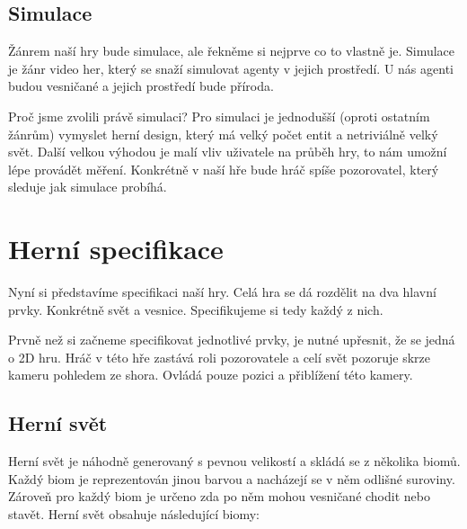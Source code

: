 
\subsection{Simulace}
Žánrem naší hry bude simulace, ale řekněme si nejprve co to vlastně je. Simulace je žánr video her, který se snaží simulovat agenty v jejich prostředí. U nás agenti budou vesničané a jejich prostředí bude příroda.

Proč jsme zvolili právě simulaci? Pro simulaci je jednodušší (oproti ostatním žánrům) vymyslet herní design, který má velký počet entit a netriviálně velký svět. Další velkou výhodou je malí vliv uživatele na průběh hry, to nám umožní lépe provádět měření. Konkrétně v naší hře bude hráč spíše pozorovatel, který sleduje jak simulace probíhá.


\section{Herní specifikace}
\label{sec:game-spec}
Nyní si představíme specifikaci naší hry. Celá hra se dá rozdělit na dva hlavní prvky. Konkrétně svět a vesnice. Specifikujeme si tedy každý z nich.

Prvně než si začneme specifikovat jednotlivé prvky, je nutné upřesnit, že se jedná o 2D hru. Hráč v této hře zastává roli pozorovatele a celí svět pozoruje skrze kameru pohledem ze shora. Ovládá pouze pozici a přiblížení této kamery.

\subsection{Herní svět}
\label{sec:game-world}
Herní svět je náhodně generovaný s pevnou velikostí a skládá se z několika biomů. Každý biom je reprezentován jinou barvou a nacházejí se v něm odlišné suroviny. Zároveň pro každý biom je určeno zda po něm mohou vesničané chodit nebo stavět. Herní svět obsahuje následující biomy:

